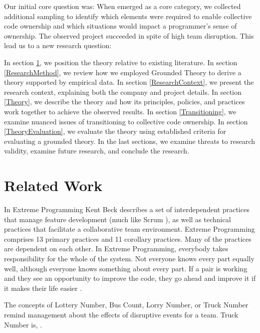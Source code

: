 Our initial core question was:  When  emerged as a core category, we collected additional sampling to identify which elements were required to enable collective code ownership and which situations would impact a programmer's sense of ownership. The observed project succeeded in spite of high team disruption. This lead us to a new research question: 

In section \ref{RelatedWork}, we position the theory relative to existing literature. In section \ref{ResearchMethod}, we review how we employed Grounded Theory to derive a theory supported by empirical data. In section \ref{ResearchContext}, we present the research context, explaining both the company and project details. In section \ref{Theory}, we describe the theory and how its principles, policies, and practices work together to achieve the observed results. In section \ref{Transitioning}, we examine nuanced issues of transitioning to collective code ownership. In section \ref{TheoryEvaluation}, we evaluate the theory using established criteria for evaluating a grounded theory. In the last sections, we examine threats to research validity, examine future research, and conclude the research.


\section{Related Work}
\label{RelatedWork}
In Extreme Programming \cite{ExtremeProgramming2004} Kent Beck describes a set of interdependent practices that manage feature development (much like Scrum \cite{Scrum}), as well as technical practices that facilitate a collaborative team environment.  Extreme Programming comprises 13 primary practices and 11 corollary practices. Many of the practices are dependent on each other.  {In Extreme Programming, everybody takes responsibility for the whole of the system. Not everyone knows every part equally well, although everyone knows something about every part. If a pair is working and they see an opportunity to improve the code, they go ahead and improve it if it makes their life easier}  \cite{ExtremeProgramming2000}.



The concepts of Lottery Number, Bus Count, Lorry Number, or Truck Number remind management about the effects of disruptive events for a team. Truck Number is,  \cite{WikiTruckNumber}. 


